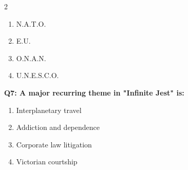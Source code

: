 \documentclass[10pt]{article}
\begin{document}
\begin{multicols}{2}
\begin{enumerate}[label=\arabic*.]
\item N.A.T.O.
\item E.U.
\item O.N.A.N.
\item U.N.E.S.C.O.
\end{enumerate}
\textbf{Q7: A major recurring theme in "Infinite Jest" is:}

\begin{enumerate}[label=\arabic*.]
\item Interplanetary travel
\item Addiction and dependence
\item Corporate law litigation
\item Victorian courtship
\end{enumerate}
\end{multicols}

\newpage
\end{document}
